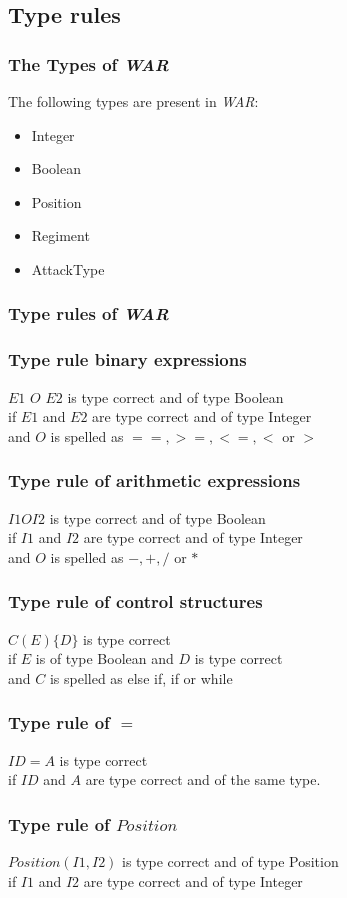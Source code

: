 \subsection{Type rules}
	\subsubsection{The Types of \textit{WAR}}
		The following types are present in \textit{WAR}: \\
		\begin{itemize}
			\item Integer
			\item Boolean
			\item Position
			\item Regiment
			\item AttackType
		\end{itemize}
		
	\subsubsection{Type rules of \textit{WAR}}
	\subsubsection{Type rule binary expressions}
		$E1$ $O$ $E2$ is type correct and of type Boolean\\
		if $E1$ and $E2$ are type correct and of type Integer \\
		and $O$ is spelled as $==,>=,<=,<$ or $>$
		
	\subsubsection{Type rule of arithmetic expressions}
		$I1 O I2$ is type correct and of type Boolean \\
		if $I1$ and $I2$ are type correct and of type Integer \\
		and $O$ is spelled as $-,+,/$ or $*$

	\subsubsection{Type rule of control structures}
		$C(E)\{D\}$ is type correct\\
		if $E$ is of type Boolean and $D$ is type correct \\
		and $C$ is spelled as else if, if or while
		
	\subsubsection*{Type rule of $=$}
		$ID = A$ is type correct\\
		if $ID$ and $A$ are type correct and of the same type.
		
	\subsubsection*{Type rule of $Position$}
		$Position(I1,I2)$ is type correct and of type Position\\
		if $I1$ and $I2$ are type correct and of type Integer
	